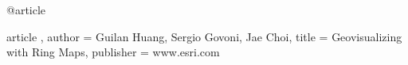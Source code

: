 @article{article ,
author = {Guilan Huang, Sergio Govoni, Jae Choi},
title = {Geovisualizing with Ring Maps},
publisher = {www.esri.com}

}
